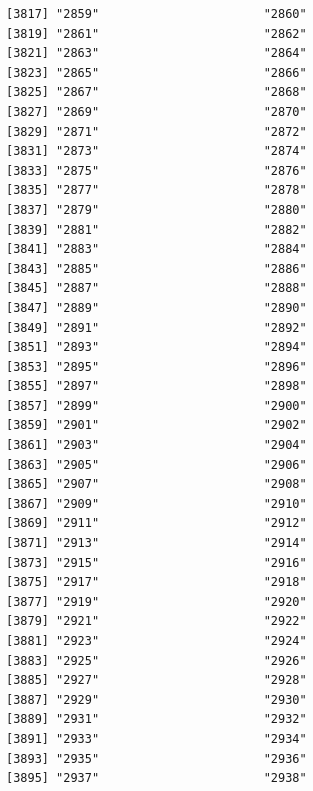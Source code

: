 \documentclass[
  letterpaper,
  DIV=11,
  numbers=noendperiod]{scrreprt}
\begin{document}
\begin{verbatim}
[3817] "2859"                       "2860"                      
[3819] "2861"                       "2862"                      
[3821] "2863"                       "2864"                      
[3823] "2865"                       "2866"                      
[3825] "2867"                       "2868"                      
[3827] "2869"                       "2870"                      
[3829] "2871"                       "2872"                      
[3831] "2873"                       "2874"                      
[3833] "2875"                       "2876"                      
[3835] "2877"                       "2878"                      
[3837] "2879"                       "2880"                      
[3839] "2881"                       "2882"                      
[3841] "2883"                       "2884"                      
[3843] "2885"                       "2886"                      
[3845] "2887"                       "2888"                      
[3847] "2889"                       "2890"                      
[3849] "2891"                       "2892"                      
[3851] "2893"                       "2894"                      
[3853] "2895"                       "2896"                      
[3855] "2897"                       "2898"                      
[3857] "2899"                       "2900"                      
[3859] "2901"                       "2902"                      
[3861] "2903"                       "2904"                      
[3863] "2905"                       "2906"                      
[3865] "2907"                       "2908"                      
[3867] "2909"                       "2910"                      
[3869] "2911"                       "2912"                      
[3871] "2913"                       "2914"                      
[3873] "2915"                       "2916"                      
[3875] "2917"                       "2918"                      
[3877] "2919"                       "2920"                      
[3879] "2921"                       "2922"                      
[3881] "2923"                       "2924"                      
[3883] "2925"                       "2926"                      
[3885] "2927"                       "2928"                      
[3887] "2929"                       "2930"                      
[3889] "2931"                       "2932"                      
[3891] "2933"                       "2934"                      
[3893] "2935"                       "2936"                      
[3895] "2937"                       "2938"                      

\end{verbatim}
\end{document}
